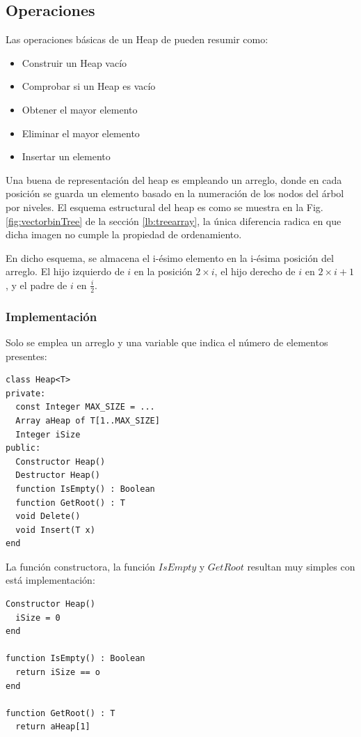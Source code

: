 \subsection{Operaciones}

Las operaciones básicas de un Heap de pueden resumir como:
\begin{itemize}
\item Construir un Heap vacío
\item Comprobar si un Heap es vacío
\item Obtener el mayor elemento
\item Eliminar el mayor elemento
\item Insertar un elemento
\end{itemize}

Una buena de representación del heap es empleando un arreglo, donde en cada posición se guarda un elemento basado en la numeración de los nodos del árbol por niveles. El esquema estructural del heap es como se muestra en la Fig. \ref{fig:vectorbinTree} de la sección \ref{lb:treearray}, la única diferencia radica en que dicha imagen no cumple la propiedad de ordenamiento.

En dicho esquema, se almacena el i-ésimo elemento en la i-ésima posición del arreglo. El hijo izquierdo de $i$ en la posición $2 \times i$, el hijo derecho de $i$ en $2 \times i+1$, y el padre de $i$ en $\frac{i}{2}$.

\subsubsection{Implementación}

Solo se emplea un arreglo y una variable que indica el número de elementos presentes:
\begin{lstlisting}[upquote=true, language=pseudo]
class Heap<T>
private: 
  const Integer MAX_SIZE = ...
  Array aHeap of T[1..MAX_SIZE]
  Integer iSize
public:
  Constructor Heap()
  Destructor Heap()
  function IsEmpty() : Boolean
  function GetRoot() : T
  void Delete()
  void Insert(T x)
end
\end{lstlisting}

La función constructora, la función $IsEmpty$ y $GetRoot$ resultan muy simples con está implementación:

\begin{lstlisting}[upquote=true, language=pseudo]
Constructor Heap()
  iSize = 0
end

function IsEmpty() : Boolean
  return iSize == o
end

function GetRoot() : T
  return aHeap[1]
\end{lstlisting}


